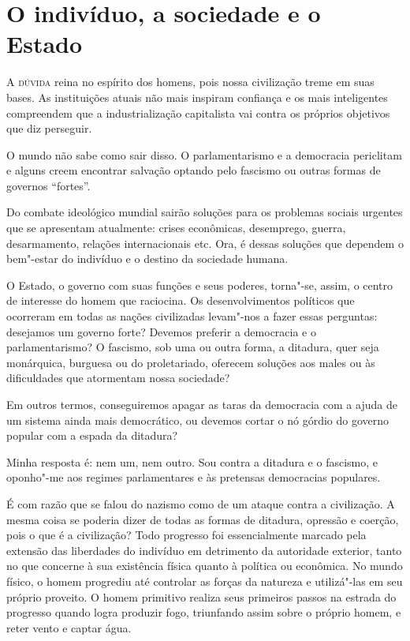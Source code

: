 \chapter{O indivíduo, a sociedade e o Estado}

\textsc{A dúvida} reina no espírito dos homens, pois nossa civilização treme em
suas bases. As instituições atuais não mais inspiram confiança e os
mais inteligentes compreendem que a industrialização capitalista vai
contra os próprios objetivos que diz perseguir.

O mundo não sabe como sair disso. O parlamentarismo e a democracia
periclitam e alguns creem encontrar salvação optando pelo fascismo ou
outras formas de governos “fortes”.

Do combate ideológico mundial sairão soluções para os problemas sociais
urgentes que se apresentam atualmente: crises econômicas, desemprego,
guerra, desarmamento, relações internacionais etc. Ora, é dessas
soluções que dependem o bem"-estar do indivíduo e o destino da
sociedade humana.

O Estado, o governo com suas funções e seus poderes, torna"-se, assim,
o centro de interesse do homem que raciocina. Os desenvolvimentos
políticos que ocorreram em todas as nações civilizadas levam"-nos a
fazer essas perguntas: desejamos um governo forte? Devemos preferir a
democracia e o parlamentarismo? O fascismo, sob uma ou outra forma, a
ditadura, quer seja monárquica, burguesa ou do proletariado,
oferecem soluções aos males ou às dificuldades que atormentam nossa
sociedade?

Em outros termos, conseguiremos apagar as taras da democracia com a
ajuda de um sistema ainda mais democrático, ou devemos cortar o
nó górdio do governo popular com a espada da ditadura?

Minha resposta é: nem um, nem outro. Sou contra a ditadura e o fascismo,
e oponho"-me aos regimes parlamentares e às pretensas democracias
populares.

É com razão que se falou do nazismo como de um ataque contra a
civilização. A mesma coisa se poderia dizer de todas as formas de
ditadura, opressão e coerção, pois o que é a civilização? Todo
progresso foi essencialmente marcado pela extensão das liberdades do
indivíduo em detrimento da autoridade exterior, tanto no que concerne à
sua existência física quanto à política ou econômica. No mundo físico, o
homem progrediu até controlar as forças da natureza e utilizá"-las em
seu próprio proveito. O homem primitivo realiza seus primeiros passos
na estrada do progresso quando logra produzir fogo, triunfando assim
sobre o próprio homem, e reter vento e captar água.

